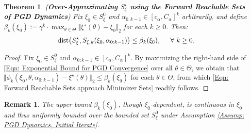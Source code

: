 \documentclass[letterpaper, 10 pt, conference]{ieeeconf}
\newcommand{\?}{\stackrel{?}{=}}
\newcommand{\param}{\theta}
\newcommand{\paramSet}{\Theta}
\newcommand{\var}{\xi}
\newcommand{\varMap}{\phi}
\newcommand{\varOpt}{\var^\star}
\newcommand{\varDim}{n}
\newcommand{\varOptSet}{S_\var^\star}
\newcommand{\convergenceRadius}{\beta}
\newcommand{\ballUnit}{\mathbb{B}}
\newcommand{\ratePGD}{\alpha}
\newcommand{\ratePGDMin}{c_\ratePGD}
\newcommand{\ratePGDMax}{C_\ratePGD}
\newcommand{\convergenceRatePGD}{\gamma}
\newcommand{\varInitialSet}{S_\var^0}
\newcommand{\varForwardReachableSet}[1]{S_{\var, {#1}}}
\newcommand{\dist}{\text{dist}}
\newtheorem{remark}{Remark}
\newtheorem{theorem}{Theorem}
\newcommand{\frank}[1]{{\textcolor[rgb]{0,0,1}{\textsf{[Frank: {#1}]}}}}
\begin{document}
\begin{theorem}
(\textbf{Over-Approximating $\varOptSet$ using the Forward Reachable Sets of PGD Dynamics})
\label{Thm: Over-approximating Minimizer Set using Forward Reachable Sets}
Fix $\var_0 \in \varInitialSet$ and $\ratePGD_{0:k-1} \in [\ratePGDMin, \ratePGDMax]^k$ arbitrarily, and define $\convergenceRadius_k(\var_0) := \convergenceRatePGD^k \cdot \max_{\param \in \paramSet} \Vert \varOpt(\param) - \var_0 \Vert_2$ for each $k \geq 0$. Then:
\begin{align}
    \label{Eqn: Forward Reachable Sets approach Minimizer Sets}
    \dist\big(\varOptSet, \varForwardReachableSet{k}(\var_0, \ratePGD_{0:k-1}) \big) \leq \convergenceRadius_k(\var_0), \hspace{5mm} \forall \ k \geq 0.
\end{align}
\end{theorem}

\begin{proof}
Fix $\var_0 \in \varInitialSet$ and $\ratePGD_{0:k-1} \in [\ratePGDMin, \ratePGDMax]^k$.
By maximizing the right-hand side of \eqref{Eqn: Exponential Bound for PGD Convergence} over all $\param \in \paramSet$, we obtain that $\Vert \varMap_k(\var_0, \param, \ratePGD_{0:k-1}) - \varOpt(\param) \Vert_2 \leq \convergenceRadius_k(\var_0)$ for each $\param \in \paramSet$, from which 
\eqref{Eqn: Forward Reachable Sets approach Minimizer Sets}
readily follows.  
\end{proof}

\begin{remark}
\label{Remark: Upper bound for convergence radius}
The upper bound $\convergenceRadius_k(\var_0)$, though $\var_0$-dependent, is continuous in $\var_0$ and thus uniformly bounded over the bounded set $\varInitialSet$ under Assumption \ref{Assump: PGD Dynamics, Initial Iterate}.


\end{remark}
\end{document}
